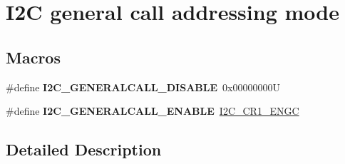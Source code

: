 \hypertarget{group___i2_c__general__call__addressing__mode}{}\section{I2C general call addressing mode}
\label{group___i2_c__general__call__addressing__mode}
\subsection*{Macros}
\begin{DoxyCompactItemize}
\item 
\mbox{\label{group___i2_c__general__call__addressing__mode_ga14918ea7d2b23cd67c66b49ebbf5c0a8}} 
\#define {\bfseries I2\+C\+\_\+\+G\+E\+N\+E\+R\+A\+L\+C\+A\+L\+L\+\_\+\+D\+I\+S\+A\+B\+LE}~0x00000000U
\item 
\mbox{\label{group___i2_c__general__call__addressing__mode_ga5ec9ec869e4c78a597c5007c245c01a0}} 
\#define {\bfseries I2\+C\+\_\+\+G\+E\+N\+E\+R\+A\+L\+C\+A\+L\+L\+\_\+\+E\+N\+A\+B\+LE}~\hyperlink{group___peripheral___registers___bits___definition_ga1d8c219193b11f8507d7b85831d14912}{I2\+C\+\_\+\+C\+R1\+\_\+\+E\+N\+GC}
\end{DoxyCompactItemize}


\subsection{Detailed Description}
